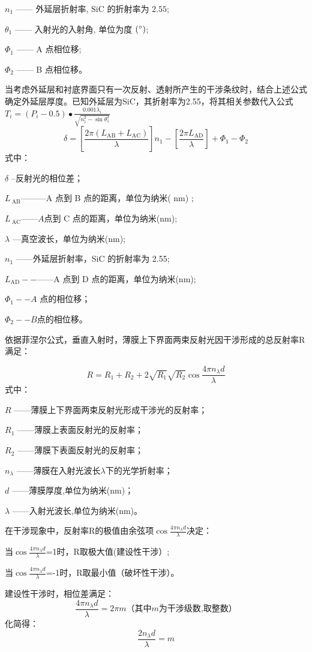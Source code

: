 \documentclass[withoutpreface,bwprint]{cumcmthesis}
\begin{document}
$n_{1}$ —— 外延层折射率, SiC 的折射率为 $2.55$;

$\theta_{1}$ —— 入射光的入射角, 单位为度 $(\degree)$;

$\varPhi_{1}$ —— A 点相位移;

$\varPhi_{2}$ —— B 点相位移。

当考虑外延层和衬底界面只有一次反射、透射所产生的干涉条纹时，结合上述公式确定外延层厚度。已知外延层为SiC，其折射率为2.55，将其相关参数代入公式$T_i=(P_i-0.5)\bullet\frac{0.001\lambda_i}{\sqrt{n_1^2-\sin\theta_1^2}}$
\begin{equation}\delta=\left[\frac{2\pi(L_{\mathrm{AB}}+L_{\mathrm{AC}})}{\lambda}\right]n_1-\left[\frac{2\pi L_{\mathrm{AD}}}{\lambda}\right]+\Phi_1-\Phi_2\end{equation}
式中：

$\delta$ --反射光的相位差；

$L_{\mathrm{~AB}}$———A 点到 B 点的距离，单位为纳米( nm) ;

$L_{\mathrm{~AC}}——A$点到 C 点的距离，单位为纳米(nm);

$\lambda$ ---真空波长，单位为纳米(nm);

$n_1$ ——外延层折射率，SiC 的折射率为 2.55;

$L_\mathrm{AD}--$——A 点到 D 点的距离，单位为纳米(nm);

$\Phi_1--A$ 点的相位移；

$\Phi_2--B$点的相位移。

依据菲涅尔公式，垂直入射时，薄膜上下界面两束反射光因干涉形成的总反射率R满足：

$$R=R_{1}+R_{2}+2\sqrt{R_{1}}\sqrt{R_{2}}\cos\frac{4\pi n_{\lambda}d}{\lambda}$$
式中：

$R$ ——薄膜上下界面两束反射光形成干涉光的反射率；

$R_{1}$ ——薄膜上表面反射光的反射率；

$R_{2}$ ——薄膜下表面反射光的反射率；

$n_{\lambda}$ ——薄膜在入射光波长$\lambda$下的光学折射率；

$d$ ——薄膜厚度,单位为纳米(nm)；

$\lambda$ ——入射光波长,单位为纳米(nm)。

在干涉现象中，反射率R的极值由余弦项$\cos\frac{4\pi n_\lambda d}{\lambda}$决定：

当$\cos\frac{4\pi n_\lambda d}{\lambda}$=1时，R取极大值(建设性干涉）;

当$\cos\frac{4\pi n_\lambda d}{\lambda}$=-1时，R取最小值（破坏性干涉）。

建设性干涉时，相位差满足：
\begin{equation}
\frac{4\pi n_\lambda d}{\lambda} = 2\pi m \text{（其中$m$为干涉级数,取整数）}
\end{equation}
化简得：
\begin{equation}
\frac{2n_\lambda d}{\lambda} = m
\end{equation}
\end{document}
